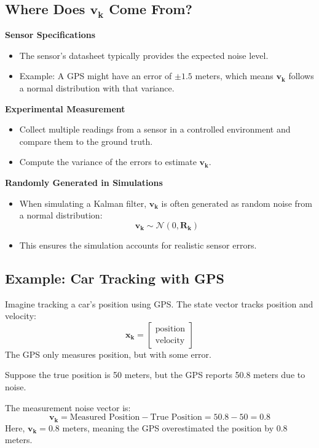 \documentclass{article}
\begin{document}
\subsection*{Where Does \(\mathbf{v_k}\) Come From?}

\textbf{Sensor Specifications}  
\begin{itemize}
    \item The sensor’s datasheet typically provides the expected noise level.
    \item Example: A GPS might have an error of \(\pm1.5\) meters, which means \(\mathbf{v_k}\) follows a normal distribution with that variance.
\end{itemize}

\textbf{Experimental Measurement}  
\begin{itemize}
    \item Collect multiple readings from a sensor in a controlled environment and compare them to the ground truth.
    \item Compute the variance of the errors to estimate \(\mathbf{v_k}\).
\end{itemize}

\textbf{Randomly Generated in Simulations}  
\begin{itemize}
    \item When simulating a Kalman filter, \(\mathbf{v_k}\) is often generated as random noise from a normal distribution:
    \[
    \mathbf{v_k} \sim \mathcal{N}(0, \mathbf{R_k})
    \]
    \item This ensures the simulation accounts for realistic sensor errors.
\end{itemize}

\subsection*{Example: Car Tracking with GPS}

Imagine tracking a car's position using GPS. The state vector tracks position and velocity:
\[
\mathbf{x_k} =
\begin{bmatrix}
\text{position} \\
\text{velocity}
\end{bmatrix}
\]
The GPS only measures position, but with some error.

Suppose the true position is 50 meters, but the GPS reports 50.8 meters due to noise.

The measurement noise vector is:
\[
\mathbf{v_k} = \text{Measured Position} - \text{True Position} = 50.8 - 50 = 0.8
\]
Here, \(\mathbf{v_k} = 0.8\) meters, meaning the GPS overestimated the position by 0.8 meters.
\end{document}
